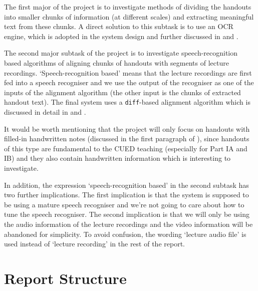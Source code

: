 The first major of the project is to investigate methods of dividing the handouts into smaller chunks of information (at different scales) and extracting meaningful text from these chunks. A direct solution to this subtask is to use an OCR engine, which is adopted in the system design and further discussed in  and .

The second major subtask of the project is to investigate speech-recognition based algorithms of aligning chunks of handouts with segments of lecture recordings. `Speech-recognition based' means that the lecture recordings are first fed into a speech recogniser and we use the output of the recogniser as one of the inputs of the alignment algorithm (the other input is the chunks of extracted handout text). The final system uses a \texttt{diff}-based alignment algorithm which is discussed in detail in  and .

It would be worth mentioning that the project will only focus on handouts with filled-in handwritten notes (discussed in the first paragraph of ), since handouts of this type are fundamental to the CUED teaching (especially for Part IA and IB) and they also contain handwritten information which is interesting to investigate. 

In addition, the expression `speech-recognition based' in the second subtask has two further implications. The first implication is that the system is supposed to be using a mature speech recogniser and we're not going to care about how to tune the speech recogniser. The second implication is that we will only be using the audio information of the lecture recordings and the video information will be abandoned for simplicity. To avoid confusion, the wording `lecture audio file' is used instead of `lecture recording' in the rest of the report.


\section{Report Structure}

